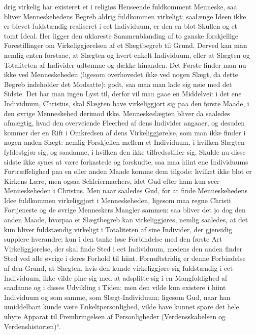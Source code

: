 \documentclass[12pt]{book}
\begin{document}
drig virkelig har existeret et i religiøs Henseende fuldkomment
Menneske, saa bliver Menneskehedens Begreb aldrig fuldkommen
virkeligt; saalænge Ideen ikke er blevet fuldstændig realiseret i
eet Individuum, er den en blot Skullen og et tomt Ideal. Her ligger
den uklareste Sammenblanding af to ganske forskjellige
Forestillinger om Virkeliggjørelsen af et Slægtbegreb til Grund.
Derved kan man nemlig enten forstaae, at Slægten og hvert enkelt
Individuum, eller at Slægten og Totaliteten af Individer udtømme og
dække hinanden. Det Første finder man nu ikke ved Menneskeheden
(ligesom overhovedet ikke ved nogen Slægt, da dette Begreb
indeholder det Modsatte): godt, saa maa man lade sig nøie med det
Sidste. Det har man ingen Lyst til, derfor vil man gaae en
Middelvei: i det ene Individuum, Christus, skal Slægten have
virkeliggjort sig paa den første Maade, i den øvrige Menneskehed
derimod ikke. Menneskeslægten bliver da saaledes afmægtig, hvad den
overveiende Fleerhed af dens Individer angaaer, og desuden kommer
der en Rift i Omkredsen af dens Virkeliggjørelse, som man ikke
finder i nogen anden Slægt: nemlig Forskjellen mellem et
Individuum, i hvilken Slægten fyldestgjør sig, og saadanne, i
hvilken den ikke tilfredsstiller sig. Skulde nu disse sidste ikke
synes at være forkastede og forskudte, saa maa hiint ene
Individuums Fortræffelighed paa en eller anden Maade komme dem
tilgode: hvilket ikke blot er Kirkens Lære, men ogsaa
Schleiermachers, idet Gud efter ham kun seer Menneskeheden i
Christus. Men naar saaledes Gud, for at finde Menneskehedens Idee
fuldkommen virkeliggjort i Menneskeheden, ligesom maa regne Christi
Fortjeneste og de øvrige Menneskers Mangler sammen: saa bliver det
jo dog den anden Maade, hvorpaa et Slægtbegreb kan virkeliggjøres,
nemlig saaledes, at det kun bliver fuldstændig virkeligt i
Totaliteten af sine Individer, der gjensidig supplere hverandre; kun
i den tanke\-
løse Forbindelse med den første Art Virkeliggjørelse, der skal finde
Sted i eet Individuum, medens den anden finder Sted ved alle øvrige
i deres Forhold til hiint. Fornuftstridig er denne Forbindelse af
den Grund, at Slægten, hvis den kunde virkeliggjøre sig fuldstændig
i eet Individuum, ikke vilde pine sig med at adsplitte sig i en
Mangfoldighed af saadanne og i disses Udvikling i Tiden; men den
vilde kun existere i hiint Individuum og som samme, som
Slægt-Individuum; ligesom Gud, naar han umiddelbart kunde være
Enkeltpersonlighed, vilde have kunnet spare det hele uhyre Apparat
til Frembringelsen af Personligheder (Verdensskabelsen og
Verdenshistorien)“.
\end{document}
